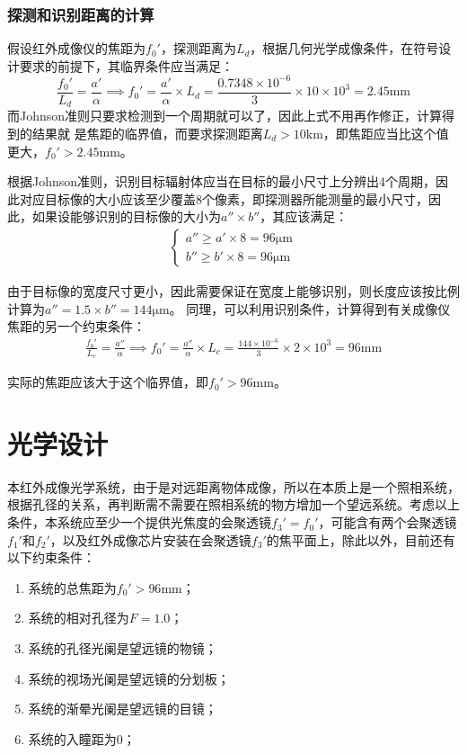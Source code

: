 \documentclass[11pt]{article}
\begin{document}
\subsubsection{探测和识别距离的计算}
假设红外成像仪的焦距为$f_0'$，探测距离为$L_d$，根据几何光学成像条件，在符号设计要求的前提下，其临界条件应当满足：
\begin{equation*}
  \frac{f_0'}{L_d}=\frac{a'}{\alpha}\implies f_0'=\frac{a'}{\alpha}\times L_d=\frac{0.7348\times10^{-6}}{3}\times 10\times10^3=2.45\unit{\mm}
\end{equation*}
而Johnson准则只要求检测到一个周期就可以了，因此上式不用再作修正，计算得到的结果就 是焦距的临界值，而要求探测距离$L_d>10\unit{\km}$，即焦距应当比这个值更大，$f_0'>2.45\unit{\mm}$。\par
根据Johnson准则，识别目标辐射体应当在目标的最小尺寸上分辨出4个周期，因此对应目标像的大小应该至少覆盖8个像素，即探测器所能测量的最小尺寸，因此，如果设能够识别的目标像的大小为$a''\times b''$，其应该满足：
\begin{align*}
  \left\{
  \begin{aligned}
    a'' \geq a'\times8=96\unit{\um} \\
    b''\geq b'\times8=96\unit{\um}
  \end{aligned}
  \right.
\end{align*}\par
由于目标像的宽度尺寸更小，因此需要保证在宽度上能够识别，则长度应该按比例计算为$\displaystyle a''=1.5\times b''=144\unit{\um}$。
同理，可以利用识别条件，计算得到有关成像仪焦距的另一个约束条件：
\begin{align*}
  \frac{f_0'}{L_c}=\frac{a''}{\alpha}\implies f_0'=\frac{a''}{\alpha}\times L_c=\frac{144\times10^{-6}}{3}\times2\times10^3=96\unit{\mm}
\end{align*}\par
实际的焦距应该大于这个临界值，即$f_0'>96\unit{\mm}$。
\section{光学设计}

本红外成像光学系统，由于是对远距离物体成像，所以在本质上是一个照相系统，根据孔径的关系，再判断需不需要在照相系统的物方增加一个望远系统。考虑以上条件，本系统应至少一个提供光焦度的会聚透镜$f_3'=f_0'$，可能含有两个会聚透镜$f_1'$和$f_2'$，以及红外成像芯片安装在会聚透镜$f_3'$的焦平面上，除此以外，目前还有以下约束条件：
\begin{enumerate}
  \item 系统的总焦距为$f_0'>96\unit{\mm}$；
  \item 系统的相对孔径为$F=1.0$；
  \item 系统的孔径光阑是望远镜的物镜；
  \item 系统的视场光阑是望远镜的分划板；
  \item 系统的渐晕光阑是望远镜的目镜；
  \item 系统的入瞳距为0；
\end{enumerate}
\end{document}

